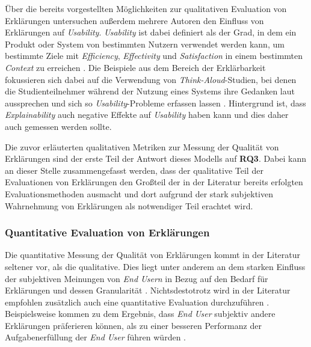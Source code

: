 
Über die bereits vorgestellten Möglichkeiten zur qualitativen Evaluation von Erklärungen untersuchen außerdem mehrere Autoren den Einfluss von Erklärungen auf \textit{Usability}. \textit{Usability} ist dabei definiert als der \glqq Grad, in dem ein Produkt oder System von bestimmten Nutzern verwendet werden kann, um bestimmte Ziele mit \textit{Efficiency}, \textit{Effectivity} und \textit{Satisfaction} in einem bestimmten \textit{Context} zu erreichen \grqq{} \cite[übersetzt vgl.][]{international2011iso}. Die Beispiele aus dem Bereich der Erklärbarkeit fokussieren sich dabei auf die Verwendung von \textit{Think-Aloud}-Studien, bei denen die Studienteilnehmer während der Nutzung eines Systems ihre Gedanken laut aussprechen und sich so \textit{Usability}-Probleme erfassen lassen \cite{wiegand_id_2020, yamada_evaluating_2016}. Hintergrund ist, dass \textit{Explainability} auch negative Effekte auf \textit{Usability} haben kann \cite{chazette_knowledge_nodate} und dies daher auch gemessen werden sollte.

\bigskip

Die zuvor erläuterten qualitativen Metriken zur Messung der Qualität von Erklärungen sind der erste Teil der Antwort dieses Modells auf \textbf{RQ3}. Dabei kann an dieser Stelle zusammengefasst werden, dass der qualitative Teil der Evaluationen von Erklärungen den Großteil der in der Literatur bereits erfolgten Evaluationsmethoden ausmacht und dort aufgrund der stark subjektiven Wahrnehmung von Erklärungen als notwendiger Teil erachtet wird.

\subsubsection{Quantitative Evaluation von Erklärungen}

Die quantitative Messung der Qualität von Erklärungen kommt in der Literatur seltener vor, als die qualitative. Dies liegt unter anderem an dem starken Einfluss der subjektiven Meinungen von \textit{End Usern} in Bezug auf den Bedarf für Erklärungen und dessen Granularität \cite{chazette_end-users_nodate, kouki_user_2017}. Nichtsdestotrotz wird in der Literatur empfohlen zusätzlich auch eine quantitative Evaluation durchzuführen \cite{balog_measuring_2020}. Beispielsweise kommen \citeauthor{wiegand2019drive} zu dem Ergebnis, dass \textit{End User} subjektiv andere Erklärungen präferieren können, als zu einer besseren Performanz der Aufgabenerfüllung der \textit{End User} führen würden \cite{wiegand2019drive}.

